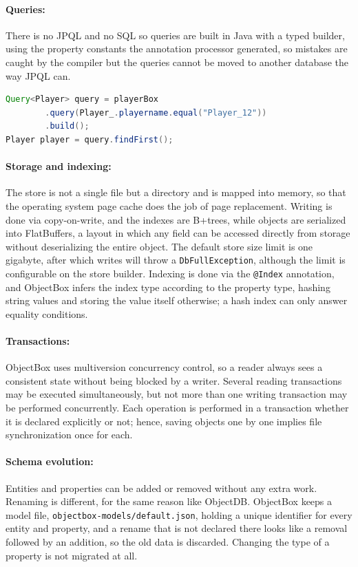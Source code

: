 \documentclass{article}
\begin{document}
\paragraph{Queries:} There is no JPQL and no SQL so queries are built in Java with
a typed builder, using the property constants the annotation processor generated,
so mistakes are caught by the compiler but the queries cannot be moved to another
database the way JPQL can.

\begin{lstlisting}[language=Java]
Query<Player> query = playerBox
        .query(Player_.playername.equal("Player_12"))
        .build();
Player player = query.findFirst();
\end{lstlisting}

\paragraph{Storage and indexing:} The store is not a single file but a directory
and is mapped into memory, so that the operating system page cache does the job
of page replacement. Writing is done via copy-on-write, and the indexes are
B+trees\cite{dbdb_objectbox}, while objects are serialized into FlatBuffers, a
layout in which any field can be accessed directly from storage without
deserializing the entire object\cite{objectbox_github}. The default store size
limit is one gigabyte, after which writes will throw a \texttt{DbFullException},
although the limit is configurable on the store builder\cite{objectbox_javadoc}.
Indexing is done via the \texttt{@Index} annotation, and ObjectBox infers the
index type according to the property type, hashing string values and storing the
value itself otherwise; a hash index can only answer equality
conditions\cite{objectbox_docs}.

\paragraph{Transactions:} ObjectBox uses multiversion concurrency control, so a
reader always sees a consistent state without being blocked by a writer. Several
reading transactions may be executed simultaneously, but not more than one
writing transaction may be performed concurrently. Each operation is performed in
a transaction whether it is declared explicitly or not; hence, saving objects one
by one implies file synchronization once for each\cite{objectbox_docs}.

\paragraph{Schema evolution:} Entities and properties can be added or removed
without any extra work. Renaming is different, for the same reason like ObjectDB. ObjectBox keeps a model file, \texttt{objectbox-models/default.json},
holding a unique identifier for every entity and property, and a rename that is
not declared there looks like a removal followed by an addition, so the old data
is discarded. Changing the type of a property is not migrated at
all\cite{objectbox_docs}.
\end{document}
